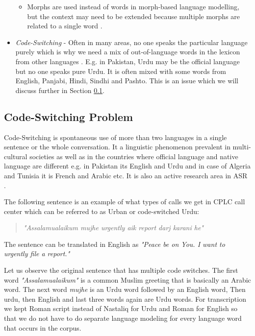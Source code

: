 \begin{itemize}
\begin{itemize}
        \item Morphs are used instead of words in morph-based language modelling, but the context may need to be extended because multiple morphs are related to a single word \cite{creutz_morph-based_2007}.
    \end{itemize}  
    \item \textit{Code-Switching} - Often in many areas, no one speaks the particular language purely which is why we need a mix of out-of-language words in the lexicon from other languages \cite{farooq_enhancing_2020}. E.g. in Pakistan, Urdu may be the official language but no one speaks pure Urdu. It is often mixed with some words from English, Panjabi, Hindi, Sindhi and Pashto. This is an issue which we will discuss further in Section \ref{sub:code-switching-problem}. 
\end{itemize}

\subsection{Code-Switching Problem}
\label{sub:code-switching-problem}

Code-Switching is spontaneous use of more than two languages in a single sentence or the whole conversation. It a linguistic phenomenon prevalent in multi-cultural societies as well as in the countries where official language and native language are different e.g. in Pakistan its English and Urdu and in case of Algeria and Tunisia it is French and Arabic etc. It is also an active research area in ASR \cite{farooq_enhancing_2020}.

The following sentence is an example of what types of calls we get in CPLC call center which can be referred to as Urban or code-switched Urdu: 
\begin{quote}
\textit{"Assalamualaikum mujhe urgently aik report darj karani he"}    
\end{quote}

The sentence can be translated in English as \textit{"Peace be on You. I want to urgently file a report."}
\vspace{11pt}
\par
Let us observe the original sentence that has multiple code switches. The first word \textit{"Assalamualaikum"} is a common Muslim greeting that is basically an Arabic word. The next word \textit{mujhe} is an Urdu word followed by an English word, Then urdu, then English and last three words again are Urdu words. For transcription  we kept Roman script instead of Nastaliq for Urdu and Roman for English so that we do not have to do separate language modeling for every language word that occurs in the corpus.

